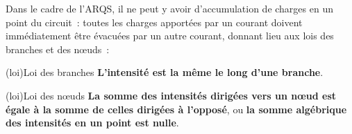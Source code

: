 \documentclass[../../main/main.tex]{subfiles}
\begin{document}
Dans le cadre de l'ARQS, il ne peut y avoir d'accumulation de charges en un
point du circuit~: toutes les charges apportées par un courant doivent
immédiatement être évacuées par un autre courant, donnant lieu aux lois des
branches et des nœuds~:
\begin{tcb*}[label=loi:branche, sidebyside, halign upper=center](loi){Loi des branches}
	\textbf{L'intensité est la même le long d'une branche}.
	\tcblower
	\begin{center}
	\end{center}
\end{tcb*}
\begin{tcb*}[label=loi:noeud, sidebyside, halign upper=center](loi){Loi des nœuds}
	\textbf{La somme des intensités dirigées vers un nœud est égale à la somme de
		celles dirigées à l'opposé}, ou \textbf{la somme algébrique des intensités
		en un point est nulle}.
	\tcblower
	\begin{center}
	\end{center}
\end{tcb*}
\end{document}
